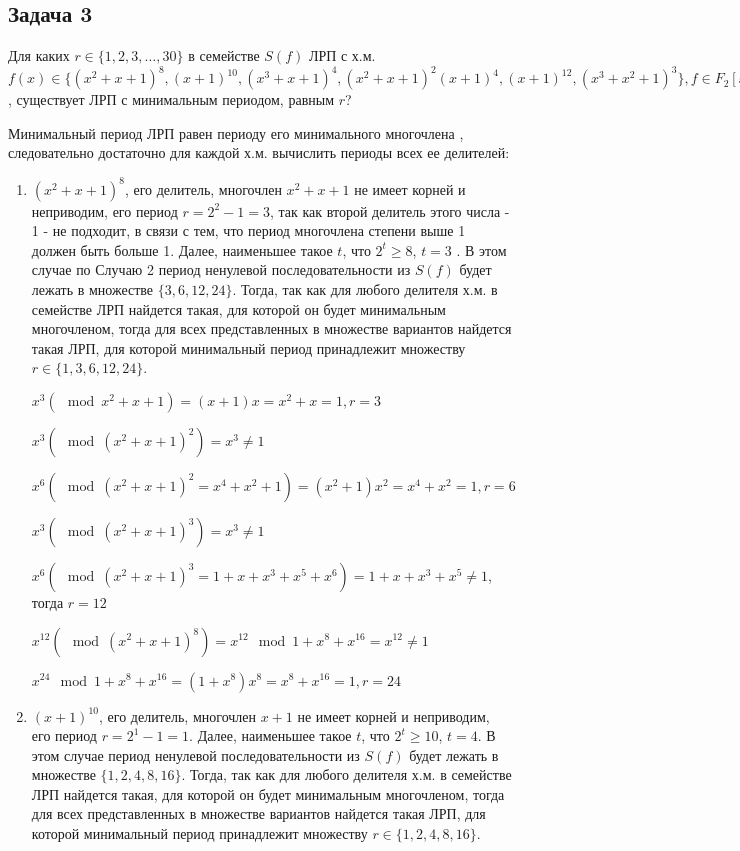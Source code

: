 \documentclass[utf8x, 14pt]{G7-32} %
\begin{document}
\subsection{Задача 3}
Для каких $r\in\{1,2,3,…,30\}$ в семействе $S(f)$ ЛРП с х.м. $f(x)\in\{(x^2+x+1)^8, (x+1)^{10}, (x^3+x+1)^4, (x^2+x+1)^2(x+1)^4, (x+1)^{12}, (x^3+x^2+1)^3\}, f\in F_2[x]$, существует ЛРП с минимальным периодом, равным $r$?

Минимальный период ЛРП равен периоду его минимального многочлена \cite{hse:Teoria_Gener}, следовательно достаточно для каждой х.м. вычислить периоды всех ее делителей:

\begin{enumerate}
    \item $(x^2+x+1)^8$, его делитель, многочлен $x^2+x+1$ не имеет корней и неприводим, его период $r = 2^2 -1 = 3$, так как второй делитель этого числа - 1 - не подходит, в связи с тем, что период многочлена степени выше 1 должен быть больше 1. Далее, наименьшее такое $t$, что $2^t \geq 8$, $t=3$ \cite{hse:Teoria_Gener}. В этом случае по Случаю 2 \cite{hse:Teoria_Gener} период ненулевой последовательности из $S(f)$ будет лежать в множестве $\{3, 6, 12, 24\}$. Тогда, так как для любого делителя х.м. в семействе ЛРП найдется такая, для которой он будет минимальным многочленом, тогда для всех представленных в множестве вариантов найдется такая ЛРП, для которой минимальный период принадлежит множеству $r \in \{1,3,6,12,24 \}$. 
    
    $x^3 (\mod x^2+x+1) = (x+1)x = x^2+x = 1, r = 3$
    
    $x^3 (\mod (x^2+x+1)^2) = x^3 \neq 1$
    
    $x^6 (\mod (x^2+x+1)^2 = x^4+x^2+1) = (x^2+1)x^2 = x^4+x^2 = 1, r = 6$
    
    $x^3 (\mod (x^2+x+1)^3) = x^3 \neq 1$
    
    $x^6 (\mod (x^2+x+1)^3 = 1 + x+ x^3+x^5+ x^6) = 1 + x+ x^3+x^5 \neq 1$, тогда $r = 12$
    
    $x^{12} (\mod (x^2+x+1)^8 ) = x^{12} \mod 1 + x^8 + x^{16} = x^{12} \neq 1$
    
    $x^{24} \mod 1 + x^8 + x^{16} = (1 + x^8) x^8 = x^8 + x^{16} = 1, r = 24$
    
    \item $(x+1)^{10}$, его делитель, многочлен $x+1$ не имеет корней и неприводим, его период $r = 2^1 -1 = 1$. Далее, наименьшее такое $t$, что $2^t \geq 10$, $t=4$. В этом случае период ненулевой последовательности из $S(f)$ будет лежать в множестве $\{1, 2, 4, 8, 16\}$. Тогда, так как для любого делителя х.м. в семействе ЛРП найдется такая, для которой он будет минимальным многочленом, тогда для всех представленных в множестве вариантов найдется такая ЛРП, для которой минимальный период принадлежит множеству $r \in \{1, 2, 4, 8, 16\}$.
    

\end{enumerate}
\end{document}
